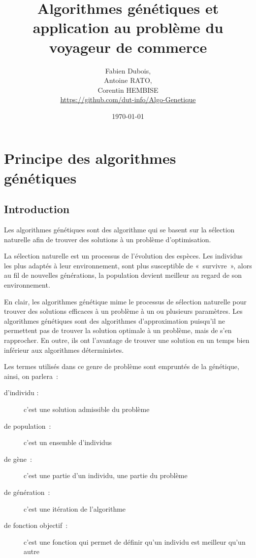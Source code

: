 \documentclass{article}
\begin{document}
\title{Algorithmes génétiques et application au problème du voyageur de commerce}
\author{Fabien Dubois,\\
   Antoine RATO,\\
   Corentin HEMBISE\\
   \url{https://github.com/dut-info/Algo-Genetique}\\}
\date{\today}

\maketitle

\tableofcontents

\newpage
\section{Principe des algorithmes génétiques}
	\subsection{Introduction}
	Les algorithmes génétiques sont des algorithme qui se basent sur la sélection naturelle afin de trouver des solutions à un problème d'optimisation. 

	La sélection naturelle est un processus de l'évolution des espèces. Les individus les plus adaptés à leur environnement, sont plus susceptible de « survivre », alors au fil de nouvelles générations, la population devient meilleur au regard de son environnement.

	En clair, les algorithmes génétique mime le processus de sélection naturelle pour trouver des solutions efficaces à un problème à un ou plusieurs paramètres.
	Les algorithmes génétiques sont des algorithmes d'approximation puisqu'il ne permettent pas de trouver la solution optimale à un problème, mais de s'en rapprocher. En outre, ils ont l'avantage de trouver une solution en un temps bien inférieur aux algorithmes déterministes.

	Les termes utilisés dans ce genre de problème sont empruntés de la génétique, ainsi, on parlera :
	\begin{description}
	\item [d'individu :] c'est une solution admissible du problème
	\item [de population :] c'est un ensemble d'individus
	\item [de gène :] c'est une partie d'un individu, une partie du problème
	\item [de génération :] c'est une itération de l'algorithme
	\item [de fonction objectif :] c'est une fonction qui permet de définir qu'un individu est meilleur qu'un autre
	\end{description}
\end{document}
